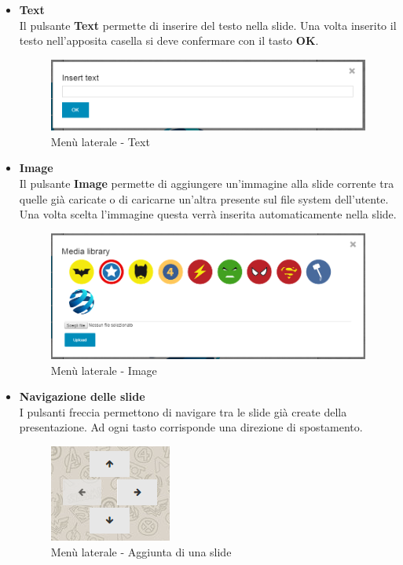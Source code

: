 \begin{itemize}
 \item \textbf{Text}\\
    Il pulsante \textbf{Text} permette di inserire del testo nella slide. Una volta inserito il testo nell'apposita casella si deve confermare con il tasto \textbf{OK}.
    \begin{figure}[H] 
	\centering 
	\includegraphics[scale=0.40] {img/editor_text.png}
	\caption{Menù laterale - Text} 
    \end{figure}
    
    
 \item \textbf{Image}\\
    Il pulsante \textbf{Image} permette di aggiungere un'immagine alla \gls{slide} corrente tra quelle già caricate o di caricarne un'altra presente sul file system dell'utente. Una volta scelta l'immagine questa verrà inserita automaticamente nella slide.
   \begin{figure}[H] 
	\centering 
	\includegraphics[scale=0.40] {img/editor_img.png}
	\caption{Menù laterale - Image} 
    \end{figure}
    
\newpage

  \item \textbf{Navigazione delle slide}\\
  I pulsanti freccia permettono di navigare tra le slide già create della presentazione. Ad ogni tasto corrisponde una direzione di spostamento.
  \begin{figure}[h] 
  	\centering 
  	\includegraphics[scale=0.80] {img/editor_move.png}
  	\caption{Menù laterale - Aggiunta di una slide} 
  \end{figure}
 

\end{itemize}
